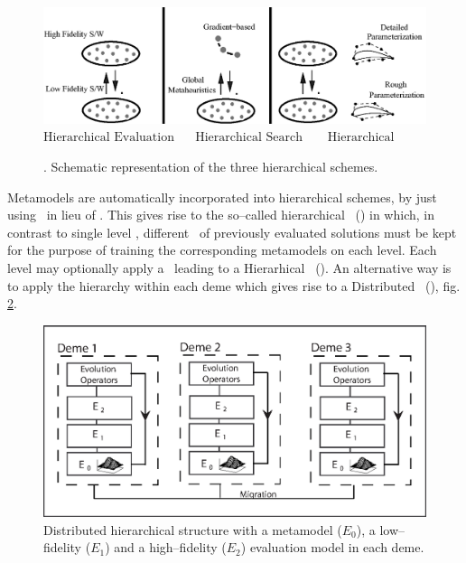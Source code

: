 \documentclass{vki_ls}
\begin{document}
\begin{figure}[h!]
    \centering
    \includegraphics[scale=0.8]{multimodes.eps}
    $\mbox{Hierarchical Evaluation~~~~~Hierarchical Search~~~~~~Hierarchical Parameterization}$
    \caption{\HEAs. Schematic representation of the three
            hierarchical schemes.}
    \label{f:allheas}
\end{figure}

Metamodels are automatically incorporated into hierarchical schemes, by just using \MAEAs\ in lieu of \EAs. 
This gives rise to the so--called hierarchical \MAEAs\ (\HMAEAs) in which, in contrast to single level \MAEAs, different \DBs\ of previously evaluated solutions must be kept for the purpose of training the corresponding metamodels on each level.
Each level may optionally apply a \DMAEA\ leading to a Hierarhical \DMAEA\ (\HDMAEA). 
An alternative way is to apply the hierarchy within each deme which gives rise to a Distributed \HMAEA\ (\DHMAEA), fig. \ref{f:dhmaea}.

\begin{figure}[h!]
    \centering
    \includegraphics[scale=0.8]{dhmaea.eps}
    \caption{Distributed hierarchical structure with a metamodel ($E_0$),
	     a low--fidelity ($E_1$) and a high--fidelity ($E_2$) 
             evaluation model in each deme.}
    \label{f:dhmaea}
\end{figure}
\end{document}

